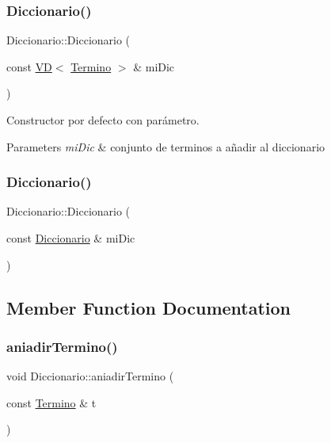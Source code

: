 \subsubsection{\texorpdfstring{Diccionario()}{Diccionario()}\hspace{0.1cm}{\footnotesize\ttfamily [2/3]}}
{\footnotesize\ttfamily Diccionario\+::\+Diccionario (\begin{DoxyParamCaption}\item[{const \mbox{\hyperlink{class_v_d}{VD}}$<$ \mbox{\hyperlink{class_termino}{Termino}} $>$ \&}]{mi\+Dic }\end{DoxyParamCaption})}



Constructor por defecto con parámetro. 


\begin{DoxyParams}{Parameters}
{\em mi\+Dic} & conjunto de terminos a añadir al diccionario \\
\hline
\end{DoxyParams}
\mbox{\label{class_diccionario_a19cb60001ffd8a8224fedc1449b6e09c}} 
\subsubsection{\texorpdfstring{Diccionario()}{Diccionario()}\hspace{0.1cm}{\footnotesize\ttfamily [3/3]}}
{\footnotesize\ttfamily Diccionario\+::\+Diccionario (\begin{DoxyParamCaption}\item[{const \mbox{\hyperlink{class_diccionario}{Diccionario}} \&}]{mi\+Dic }\end{DoxyParamCaption})}



\subsection{Member Function Documentation}
\mbox{\label{class_diccionario_ab4cc0b335a2e048fa2920186af2fe349}} 
\subsubsection{\texorpdfstring{aniadir\+Termino()}{aniadirTermino()}}
{\footnotesize\ttfamily void Diccionario\+::aniadir\+Termino (\begin{DoxyParamCaption}\item[{const \mbox{\hyperlink{class_termino}{Termino}} \&}]{t }\end{DoxyParamCaption})}

